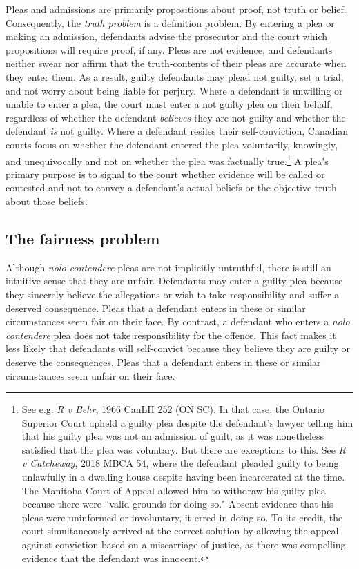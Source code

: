 Pleas and admissions are primarily propositions about proof, not truth or belief. Consequently, the \textit{truth problem} is a definition problem. By entering a plea or making an admission, defendants advise the prosecutor and the court which propositions will require proof, if any. Pleas are not evidence, and defendants neither swear nor affirm that the truth-contents of their pleas are accurate when they enter them. As a result, guilty defendants may plead not guilty, set a trial, and not worry about being liable for perjury. Where a defendant is unwilling or unable to enter a plea, the court must enter a not guilty plea on their behalf, regardless of whether the defendant \textit{believes} they are not guilty and whether the defendant \textit{is} not guilty. Where a defendant resiles their self-conviction, Canadian courts focus on whether the defendant entered the plea voluntarily, knowingly, and unequivocally and not on whether the plea was factually true.\footnote{See e.g. \textit{R v Behr}, 1966 CanLII 252 (ON SC). In that case, the Ontario Superior Court upheld a guilty plea despite the defendant's lawyer telling him that his guilty plea was not an admission of guilt, as it was nonetheless satisfied that the plea was voluntary. But there are exceptions to this. See \textit{R v Catcheway}, 2018 MBCA 54, where the defendant pleaded guilty to being unlawfully in a dwelling house despite having been incarcerated at the time. The Manitoba Court of Appeal allowed him to withdraw his guilty plea because there were ``valid grounds for doing so." Absent evidence that his pleas were uninformed or involuntary, it erred in doing so. To its credit, the court simultaneously arrived at the correct solution by allowing the appeal against conviction based on a miscarriage of justice, as there was compelling evidence that the defendant was innocent.} A plea's primary purpose is to signal to the court whether evidence will be called or contested and not to convey a defendant's actual beliefs or the objective truth about those beliefs.

\subsection{The fairness problem}

Although \textit{nolo contendere} pleas are not implicitly untruthful, there is still an intuitive sense that they are unfair. Defendants may enter a guilty plea because they sincerely believe the allegations or wish to take responsibility and suffer a deserved consequence. Pleas that a defendant enters in these or similar circumstances seem fair on their face. By contrast, a defendant who enters a \textit{nolo contendere} plea does not take responsibility for the offence. This fact makes it less likely that defendants will self-convict because they believe they are guilty or deserve the consequences. Pleas that a defendant enters in these or similar circumstances seem unfair on their face.

